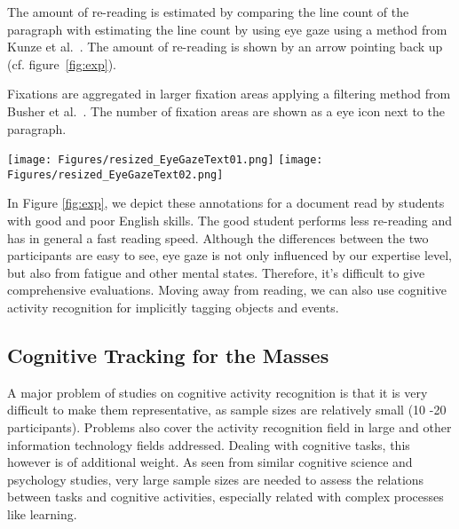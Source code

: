 \documentclass[journal]{IEEEtran}
\begin{document}
\begin{figure*}
The amount of re-reading is estimated by comparing the line count of the paragraph with estimating the line count by using eye gaze using a method from Kunze et al.~\cite{kunze2013wordometer}.
The amount of re-reading is shown by an arrow pointing back up (cf. figure~\ref{fig:exp}).

Fixations are aggregated in larger fixation areas applying a filtering method from Busher et al.~\cite{Buscher:2008:GUG:1358628.1358805}. 
The number of fixation areas are shown as a eye icon next to the paragraph.
\begin{figure*}
    \texttt{[image: Figures/resized\_EyeGazeText01.png]}
    \texttt{[image: Figures/resized\_EyeGazeText02.png]}
   
  \caption{Eye-gaze annotated document for a participant with low English skills (first four paragraphs) and higher skills (second four paragraphs). 
  First we show the raw eyegaze as recorded by the eyetracker, then the annotated document. Shading shows the reading speed: the darker the slower. The arrows on the right show the amount of re-reading and the size of the eye next to the paragraph the number of fixation areas\cite{kunze2014}.}
  \label{fig:exp}
\end{figure*}

In Figure \ref{fig:exp}, we depict these annotations for a document read by students with good and poor English skills.
The good student performs less re-reading and has in general a fast reading speed. 
Although the differences between the two participants are easy to see, eye gaze is not only influenced by our expertise level, but also from fatigue and other mental states. 
Therefore, it's difficult to give comprehensive evaluations. 
Moving away from reading, we can also use cognitive activity recognition for implicitly tagging objects and events.
  
\subsection{Cognitive Tracking for the Masses}
A major problem of studies on cognitive activity recognition is that it is very difficult to make them representative, as sample sizes are relatively small (10 -20 participants). 
Problems also cover the activity recognition field in large and other information technology fields addressed. 
Dealing with cognitive tasks, this however is of additional weight. 
As seen from similar cognitive science and psychology studies, very large sample sizes are needed to assess the relations between tasks and cognitive activities, especially related with complex processes like learning.


\end{figure*}
\end{document}
